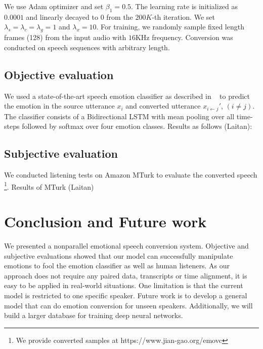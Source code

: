 \documentclass{article}
\begin{document}
We use Adam optimizer and set $\beta_1=0.5$. The learning rate is initialized as $0.0001$ and linearly decayed to $0$ from the $200K$-th iteration. We set $\lambda_s = \lambda_c = \lambda_g = 1$ and $\lambda_x=10$. For training, we randomly sample fixed length frames (128) from the input audio with $16$KHz frequency. Conversion was conducted on speech sequences with arbitrary length.


\subsection{Objective evaluation}
We used a state-of-the-art speech emotion classifier as described in ~\cite{mirsamadi2017automatic} to predict the emotion in the source utterance $x_i$ and converted utterance $x_{i\leftarrow j}'$, $(i \neq j)$. The classifier consists of a Bidirectional LSTM with mean pooling over all time-steps followed by softmax over four emotion classes. {\color{blue} Results as follows (Laitan): }

\subsection{Subjective evaluation}
We conducted listening tests on Amazon MTurk to evaluate the converted speech \footnote{We provide converted samples at https://www.jian-gao.org/emovc}.
{\color{blue} Results of MTurk (Laitan)}

\section{Conclusion and Future work}
\label{sec:con}
We presented a nonparallel emotional speech conversion system. Objective and subjective evaluations showed that our model can successfully manipulate emotions to fool the emotion classifier as well as human listeners. As our approach does not require any paired data, transcripts or time alignment, it is easy to be applied in real-world situations. {\color{blue} One limitation is that the current model is restricted to one specific speaker.} Future work is to develop a general model that can do emotion conversion for unseen speakers. Additionally, we will build a larger database for training deep neural networks.



\end{document}
